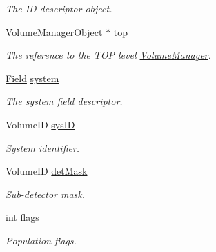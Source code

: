 \begin{DoxyCompactItemize}
\begin{DoxyCompactList}\small\item\em The ID descriptor object. \item\end{DoxyCompactList}\item 
\hyperlink{class_d_d4hep_1_1_geometry_1_1_volume_manager_object}{VolumeManagerObject} $\ast$ \hyperlink{class_d_d4hep_1_1_geometry_1_1_volume_manager_object_a2488dfe57afee14dd92f5f30a03f827f}{top}
\begin{DoxyCompactList}\small\item\em The reference to the TOP level \hyperlink{class_d_d4hep_1_1_geometry_1_1_volume_manager}{VolumeManager}. \item\end{DoxyCompactList}\item 
\hyperlink{class_d_d4hep_1_1_geometry_1_1_volume_manager_object_ab214e2fe7df311a4a2e87ec17958790c}{Field} \hyperlink{class_d_d4hep_1_1_geometry_1_1_volume_manager_object_ab53feb861c1eef621fbdb6350df70db0}{system}
\begin{DoxyCompactList}\small\item\em The system field descriptor. \item\end{DoxyCompactList}\item 
VolumeID \hyperlink{class_d_d4hep_1_1_geometry_1_1_volume_manager_object_a52c95661de580da96a5585da48064e58}{sysID}
\begin{DoxyCompactList}\small\item\em System identifier. \item\end{DoxyCompactList}\item 
VolumeID \hyperlink{class_d_d4hep_1_1_geometry_1_1_volume_manager_object_aee03c6af6623d5d678c7cb870021e974}{detMask}
\begin{DoxyCompactList}\small\item\em Sub-\/detector mask. \item\end{DoxyCompactList}\item 
int \hyperlink{class_d_d4hep_1_1_geometry_1_1_volume_manager_object_abe994d6c29e62e21c1fd2d2be21d041d}{flags}
\begin{DoxyCompactList}\small\item\em Population flags. \item\end{DoxyCompactList}\end{DoxyCompactItemize}


